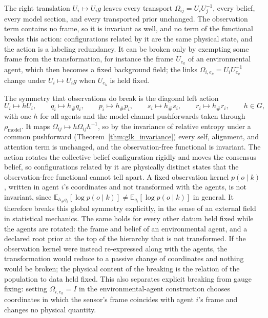 \documentclass[11pt]{article}
\begin{document}
The right translation $U_i\mapsto U_i g$ leaves every transport $\Omega_{ij}=U_iU_j^{-1}$, every belief, every model section, and every transported prior unchanged. The observation term contains no frame, so it is invariant as well, and no term of the functional breaks this action: configurations related by it are the same physical state, and the action is a labeling redundancy. It can be broken only by exempting some frame from the transformation, for instance the frame $U_{e_k}$ of an environmental agent, which then becomes a fixed background field; the links $\Omega_{i,e_k}=U_iU_{e_k}^{-1}$ change under $U_i\mapsto U_ig$ when $U_{e_k}$ is held fixed.

The symmetry that observations do break is the diagonal left action
\begin{equation}
U_i\mapsto hU_i,\qquad
q_i\mapsto h_\# q_i,\qquad
p_i\mapsto h_\# p_i,\qquad
s_i\mapsto h_\# s_i,\qquad
r_i\mapsto h_\# r_i,
\qquad h\in G,
\end{equation}
with one $h$ for all agents and the model-channel pushforwards taken through $\rho_{\mathrm{model}}$. It maps $\Omega_{ij}\mapsto h\Omega_{ij}h^{-1}$, so by the invariance of relative entropy under a common pushforward (Theorem~\ref{thm:glk_invariance}) every self, alignment, and attention term is unchanged, and the observation-free functional is invariant. The action rotates the collective belief configuration rigidly and moves the consensus belief, so configurations related by it are physically distinct states that the observation-free functional cannot tell apart. A fixed observation kernel $p(o\mid k)$, written in agent $i$'s coordinates and not transformed with the agents, is not invariant, since $\mathbb{E}_{h_\# q_i}[\log p(o\mid k)]\neq\mathbb{E}_{q_i}[\log p(o\mid k)]$ in general. It therefore breaks this global symmetry explicitly, in the sense of an external field in statistical mechanics. The same holds for every other datum held fixed while the agents are rotated: the frame and belief of an environmental agent, and a declared root prior at the top of the hierarchy that is not transformed. If the observation kernel were instead re-expressed along with the agents, the transformation would reduce to a passive change of coordinates and nothing would be broken; the physical content of the breaking is the relation of the population to data held fixed. This also separates explicit breaking from gauge fixing: setting $\Omega_{i,e_k}=I$ in the environmental-agent construction chooses coordinates in which the sensor's frame coincides with agent $i$'s frame and changes no physical quantity.
\end{document}
